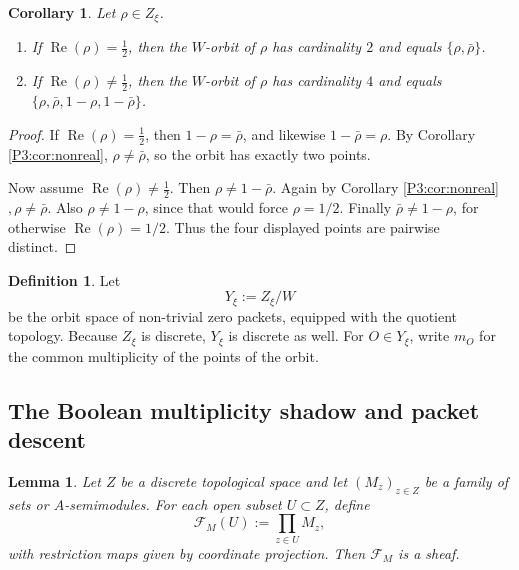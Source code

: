 \documentclass[11pt,a4paper]{article}
\numberwithin{equation}{section}
\newtheorem{lemma}[theorem]{Lemma}
\newtheorem{corollary}[theorem]{Corollary}
\theoremstyle{definition}
\newtheorem{definition}[theorem]{Definition}
\theoremstyle{remark}
\DeclareMathOperator{\Rea}{Re}
\newcommand{\cF}{\mathcal F}
\begin{document}
\begin{corollary}\label{P3:cor:orbit-sizes}
Let $\rho\in Z_\xi$.
\begin{enumerate}[label=(\roman*)]
\item If $\Rea(\rho)=\frac12$, then the $W$-orbit of $\rho$ has cardinality $2$ and equals $\{\rho,\bar\rho\}$.
\item If $\Rea(\rho)\ne \frac12$, then the $W$-orbit of $\rho$ has cardinality $4$ and equals $\{\rho,\bar\rho,1-\rho,1-\bar\rho\}$.
\end{enumerate}
\end{corollary}

\begin{proof}
If $\Rea(\rho)=\frac12$, then $1-\rho=\bar\rho$, and likewise $1-\bar\rho=\rho$.  By Corollary \ref{P3:cor:nonreal}, $\rho\ne\bar\rho$, so the orbit has exactly two points.

Now assume $\Rea(\rho)\ne\frac12$.  Then $\rho\ne1-\bar\rho$.  Again by Corollary \ref{P3:cor:nonreal}$, \rho\ne\bar\rho$.  Also $\rho\ne1-\rho$, since that would force $\rho=1/2$.  Finally $\bar\rho\ne1-\rho$, for otherwise $\Rea(\rho)=1/2$.  Thus the four displayed points are pairwise distinct.
\end{proof}

\begin{definition}
Let
\[
Y_\xi:=Z_\xi/W
\]
be the orbit space of non-trivial zero packets, equipped with the quotient topology.  Because $Z_\xi$ is discrete, $Y_\xi$ is discrete as well.  For $O\in Y_\xi$, write $m_O$ for the common multiplicity of the points of the orbit.
\end{definition}

\subsection{The Boolean multiplicity shadow and packet descent}

\begin{lemma}\label{P3:lem:product-sheaf}
Let $Z$ be a discrete topological space and let $(M_z)_{z\in Z}$ be a family of sets or $A$-semimodules.  For each open subset $U\subset Z$, define
\[
\cF_M(U):=\prod_{z\in U} M_z,
\]
with restriction maps given by coordinate projection.  Then $\cF_M$ is a sheaf.
\end{lemma}
\end{document}
